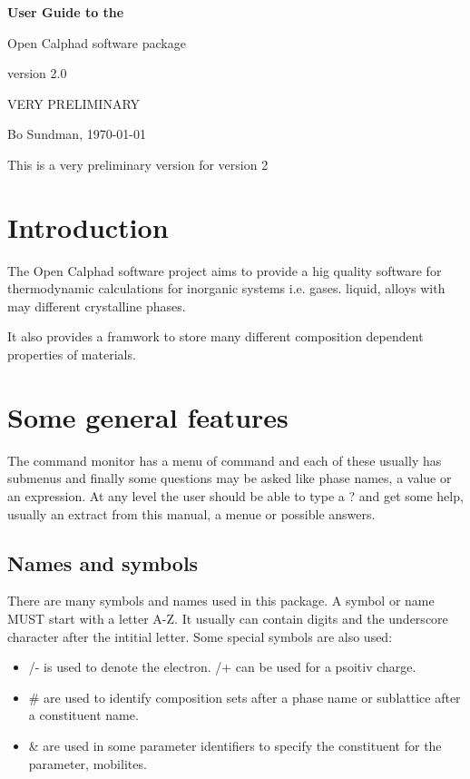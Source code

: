 \documentclass[12pt]{article}
\begin{document}
\begin{center}

{\Huge \bf User Guide to the 

Open Calphad software package

version 2.0

}

VERY PRELIMINARY

Bo Sundman, \today

\end{center}

This is a very preliminary version for version 2

\section{Introduction}

The Open Calphad software project aims to provide a hig quality
software for thermodynamic calculations for inorganic systems i.e.
gases. liquid, alloys with may different crystalline phases.

It also provides a framwork to store many different composition
dependent properties of materials.

\section{Some general features}

The command monitor has a menu of command and each of these usually
has submenus and finally some questions may be asked like phase names,
a value or an expression.  At any level the user should be able to
type a ? and get some help, usually an extract from this manual, a
menue or possible answers.

\subsection{Names and symbols}

There are many symbols and names used in this package.  A symbol or
name MUST start with a letter A-Z.  It usually can contain digits and
the underscore character after the intitial letter.  Some special
symbols are also used:

\begin{itemize}
\item /- is used to denote the electron. /+ can be used for a psoitiv charge.
\item \# are used to identify composition sets after a phase name or
sublattice after a constituent name.
\item \& are used in some parameter identifiers to specify the
  constituent for the parameter, mobilites.
\end{itemize}
\end{document}
